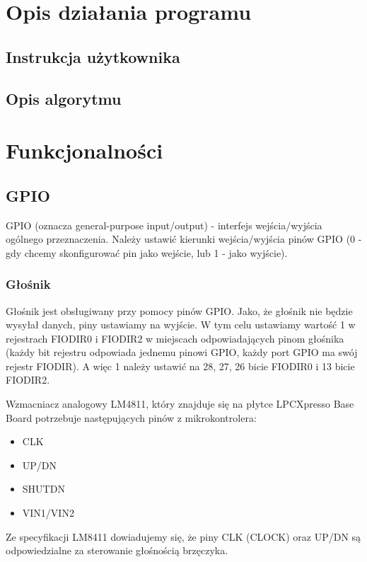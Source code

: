 \documentclass{classrep}
\begin{document}
	\section{Opis działania programu}
	
		\subsection{Instrukcja użytkownika}
		
		\subsection{Opis algorytmu}
		
	\section{Funkcjonalności}
		\subsection{GPIO}
		GPIO (oznacza general-purpose input/output) - interfejs wejścia/wyjścia ogólnego przeznaczenia. Należy ustawić kierunki wejścia/wyjścia pinów GPIO (0 - gdy chcemy skonfigurować pin jako wejście, lub 1 - jako wyjście).
		
		\subsubsection{Głośnik}
		Głośnik jest obsługiwany przy pomocy pinów GPIO.  Jako, że głośnik nie będzie wysyłał danych, piny ustawiamy na wyjście. W tym celu ustawiamy wartość 1 w rejestrach FIODIR0 i FIODIR2 w miejscach odpowiadających pinom głośnika (każdy bit rejestru odpowiada jednemu pinowi GPIO, każdy port GPIO ma swój rejestr FIODIR). A więc 1 należy ustawić na 28, 27, 26 bicie FIODIR0 i 13 bicie FIODIR2.
		
		
		Wzmacniacz analogowy LM4811, który znajduje się na płytce LPCXpresso Base Board potrzebuje następujących pinów z mikrokontrolera:
		\begin{itemize}
			\item CLK
			\item UP/DN
			\item SHUTDN
			\item VIN1/VIN2
		\end{itemize}
	
		\medskip
		Ze specyfikacji LM8411 \cite{LM4811} dowiadujemy się, że piny CLK (CLOCK) oraz UP/DN
		są odpowiedzialne za sterowanie głośnością brzęczyka.
		
\end{document}
